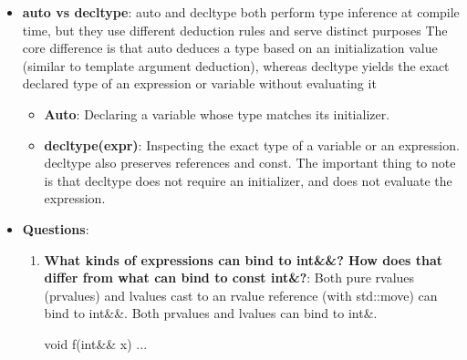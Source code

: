 \documentclass{report}
\begin{document}
\begin{itemize}
\begin{itemize}
\begin{cppcode}
                        // Post-C++17 (CTAD)
                        std::pair p3(1, 2.3);             // Automatically deduces std::pair<int, double>
                    \end{cppcode}
            \end{itemize}
            You will frequently see auto and CTAD used in the exact same line of code. They do not conflict; they handle two separate responsibilities:
            \bigbreak \noindent 
            \begin{cppcode}
            auto v = std::vector{1, 2, 3};
            \end{cppcode}
            \begin{itemize}
                \item \textbf{CTAD steps in first:} It sees std::vector\{1, 2, 3\}, looks at the integer arguments, and resolves the class type to std::vector<int>.
                \item \textbf{auto steps in second:} It looks at the resolved right-hand side (std::vector<int>) and assigns that exact type to the variable v.
            \end{itemize}
        \item \textbf{auto vs decltype}: auto and decltype both perform type inference at compile time, but they use different deduction rules and serve distinct purposes
            \bigbreak \noindent 
            The core difference is that auto deduces a type based on an initialization value (similar to template argument deduction), whereas decltype yields the exact declared type of an expression or variable without evaluating it
            \begin{itemize}
                \item \textbf{Auto}: Declaring a variable whose type matches its initializer.
                \item \textbf{decltype(expr)}: Inspecting the exact type of a variable or an expression.
                    \bigbreak \noindent 
                    decltype also preserves references and const. The important thing to note is that decltype does not require an initializer, and does not evaluate the expression.
            \end{itemize}
        \item \textbf{Questions}: 
            \begin{enumerate}
                \item \textbf{What kinds of expressions can bind to int\&\&? How does that differ from what can bind to const int\&?}: Both pure rvalues (prvalues) and lvalues cast to an rvalue reference (with std::move) can bind to int\&\&. 
                    \bigbreak \noindent 
                    Both prvalues and lvalues can bind to int\&.
                    \bigbreak \noindent 
                    \begin{cppcode}
                        void f(int&& x) { ... }


\end{cppcode}
\end{enumerate}
\end{itemize}
\end{document}
